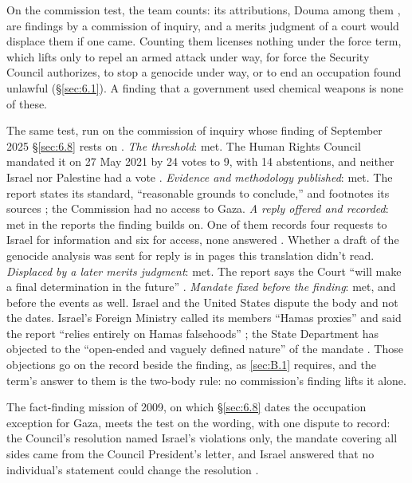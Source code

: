 On the commission test, the team counts: its attributions, Douma among them \autocite{opcw2023iitdouma}, are findings by a commission of inquiry, and a merits judgment of a court would displace them if one came. Counting them licenses nothing under the force term, which lifts only to repel an armed attack under way, for force the Security Council authorizes, to stop a genocide under way, or to end an occupation found unlawful (\S\ref{sec:6.1}). A finding that a government used chemical weapons is none of these.

The same test, run on the commission of inquiry whose finding of September 2025 \S\ref{sec:6.8} rests on \autocite{coiopt2025genocide}. \emph{The threshold}: met. The Human Rights Council mandated it on 27 May 2021 by 24 votes to 9, with 14 abstentions, and neither Israel nor Palestine had a vote \autocite{ungeneva2021coi}. \emph{Evidence and methodology published}: met. The report states its standard, “reasonable grounds to conclude,” and footnotes its sources \autocite[para.~7]{coiopt2025genocide}; the Commission had no access to Gaza. \emph{A reply offered and recorded}: met in the reports the finding builds on. One of them records four requests to Israel for information and six for access, none answered \autocite[para.~2]{coiopt2024crp4}. Whether a draft of the genocide analysis was sent for reply is in pages this translation didn't read. \emph{Displaced by a later merits judgment}: met. The report says the Court “will make a final determination in the future” \autocite[para.~6]{coiopt2025genocide}. \emph{Mandate fixed before the finding}: met, and before the events as well. Israel and the United States dispute the body and not the dates. Israel's Foreign Ministry called its members “Hamas proxies” and said the report “relies entirely on Hamas falsehoods” \autocite{karmel2025unpanel}; the State Department has objected to the “open-ended and vaguely defined nature” of the mandate \autocite{nahmias2022coi}. Those objections go on the record beside the finding, as \ref{sec:B.1} requires, and the term's answer to them is the two-body rule: no commission's finding lifts it alone.

The fact-finding mission of 2009, on which \S\ref{sec:6.8} dates the occupation exception for Gaza, meets the test on the wording, with one dispute to record: the Council's resolution named Israel's violations only, the mandate covering all sides came from the Council President's letter, and Israel answered that no individual's statement could change the resolution \autocite[Annex~II]{hrc2009gaza}.
